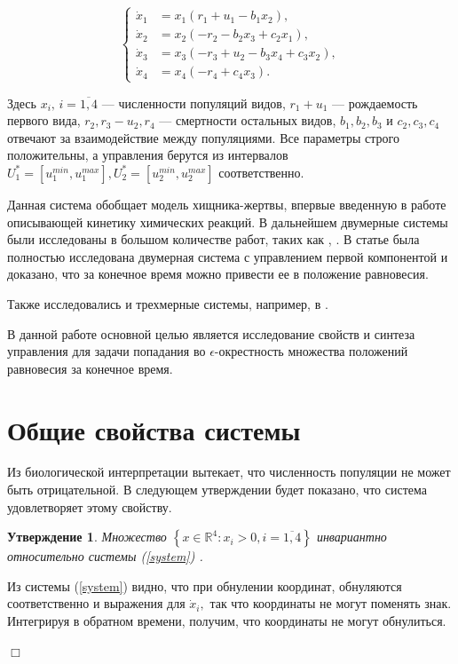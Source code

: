 \documentclass[11pt]{article}
\newtheorem{statement}{Утверждение}
\theoremstyle{definition}
\newenvironment{Proof}
{\par\noindent{\bf Доказательство.\\}} 
{\begin{flushright}$\Box$\end{flushright}}
\newcommand\Set[2]{\left\{ #1 \colon #2 \right\}}
\newcommand\Ref[1]{(\ref{#1})}
\newcommand\ftw[2]{\overline{#1,#2}}
\newcommand\RS{\Ref{system} }
\newcommand\beq{\begin{equation}}
\newcommand\eeq{\end{equation}}
\begin{document}
\beq
\left\{
\begin{aligned}
\label{system}
	\dot x_1 &= x_1(r_1 + u_1- b_1x_2), \\
	\dot x_2 &= x_2(-r_2 - b_2x_3 + c_2x_1), \\
	\dot x_3 &= x_3(-r_3 + u_2 - b_3x_4 + c_3x_2), \\
	\dot x_4 &= x_4(-r_4 + c_4x_3).
\end{aligned}
\right.
\eeq

Здесь $x_i,\, i = \ftw{1}{4}$ --- численности популяций видов, $r_1 + u_1$ --- рождаемость первого вида,  $r_2, r_3-u_2, r_4$ --- смертности остальных видов, $b_1, b_2, b_3$ и $c_2, c_3, c_4$ отвечают за взаимодействие между популяциями. Все параметры строго положительны, а управления берутся из интервалов $U_1^* = [u_1^{min}, u_1^{max}], U_2^* = [u_2^{min}, u_2^{max}]$ соответственно. 

Данная система обобщает модель хищника-жертвы, впервые введенную в работе \cite{Lotka} описывающей кинетику химических реакций. В дальнейшем двумерные системы были исследованы в большом количестве работ, таких как \cite{Murray}, \cite{Basykin}. В статье \cite{Ruble} была полностью исследована двумерная система с управлением первой компонентой и доказано, что за конечное время можно привести ее в положение равновесия. 

Также исследовались и трехмерные системы, например, в \cite{three_spec}.

В данной работе основной целью является исследование свойств и синтеза управления для задачи попадания во $\epsilon$-окрестность множества положений равновесия за конечное время. 

\section{Общие свойства системы}

\indent Из биологической интерпретации вытекает, что численность популяции не может быть отрицательной. В следующем утверждении будет показано, что система удовлетворяет этому свойству.

\begin{statement}
	Множество $\Set{x \in \mathbb{R}^4}{x_i > 0, i = \ftw{1}{4}}$ инвариантно относительно системы \RS.
\end{statement}
\begin{Proof}
	Из системы \RS видно, что при обнулении координат, обнуляются соответственно и выражения для $\dot x_i,$ так что координаты не могут поменять знак. Интегрируя в обратном времени, получим, что координаты не могут обнулиться.
\end{Proof}
\end{document}
